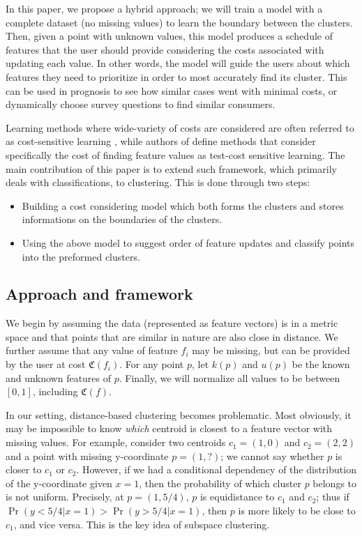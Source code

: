 \documentclass[conference]{IEEEtran}
\begin{document}
In this paper, we propose a hybrid approach; we will train a model 
with a complete dataset (no missing values) to learn
the boundary between the clusters. Then,
given a point with unknown values,  this model produces
a schedule of features that the user should provide considering the costs
associated with updating each value. In other words,
the model will guide the users about which features
they need to prioritize in order to most accurately find its cluster. This can be
used in prognosis to see how similar cases went with minimal costs, or
dynamically choose survey questions to find similar consumers.

Learning methods where wide-variety of costs are considered are
often referred to as cost-sensitive learning \cite{b6}\cite{b7}, while authors of
\cite{b8} define methods that consider specifically the cost of finding
feature values as test-cost sensitive learning. The main contribution of this 
paper is to extend such framework, which primarily deals with
classifications, to clustering. This is done through two steps:
\begin{itemize}
	\item Building a cost considering model which both forms the clusters
	and stores informations on the boundaries of the clusters.
	\item Using the above model to suggest order of feature updates and
	classify points into the preformed clusters.
\end{itemize}

\subsection{Approach and framework}
We begin by assuming the data (represented as feature vectors) is in a
metric space and that points that are similar in nature are also close in distance.
We further assume that any value of feature $f_i$ may be missing, but
can be provided by the user at cost $\mathfrak{C}(f_i)$. For any point
$p$, let $k(p)$ and $u(p)$ be the known and unknown features of $p$.
Finally, we will normalize all values to be between $[0,1]$, including 
$\mathfrak{C}(f)$.

In our setting, distance-based clustering becomes problematic. Most obviously,
it may be impossible to know \emph{which} centroid is closest to a feature
vector with missing values. For example, consider two centroids $c_1 = (1,0)$
and $c_2=(2,2)$ and a point with missing y-coordinate $p = (1,?)$; we cannot
say whether $p$ is closer to $c_1 $ or $c_2$. However, if we had a conditional
dependency of the distribution of the y-coordinate given $x=1$, then
the probability of which cluster $p$ belongs to is not uniform. Precisely, at
$p = (1,5/4)$, $p$ is equidistance to $c_1$ and $c_2$; thus
if $\Pr(y < 5/4 | x=1) > \Pr(y > 5/4 | x=1)$, then $p$ is more likely to be close
to $c_1$, and vice versa. This is the key idea of subspace clustering.
\end{document}
